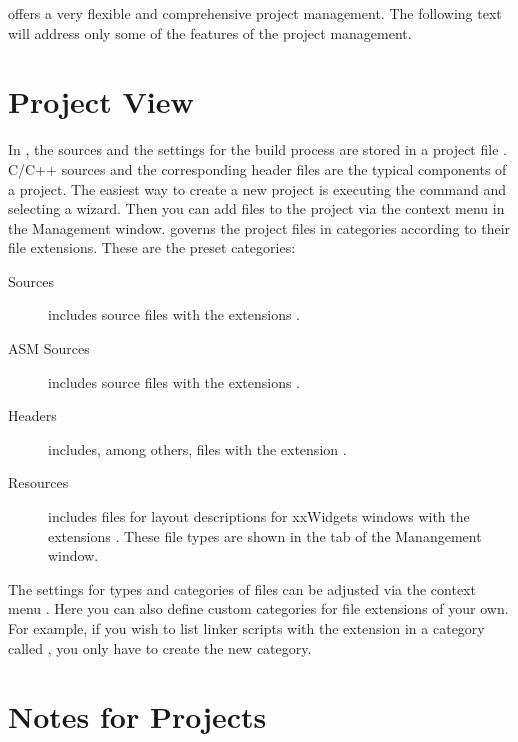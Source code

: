 \codeblocks offers a very flexible and comprehensive project management. The following text will address only some of the features of the project management.

\section{Project View}\label{sec:categories}

In \codeblocks, the sources and the settings for the build process are stored in a project file . C/C++ sources and the corresponding header files are the typical components of a project. The easiest way to create a new project is  executing the command  and selecting a wizard. Then you can add files to the project via the context menu  in the Management window. \codeblocks governs the project files in categories according to their file extensions. These are the preset categories:

\begin{description}
\item[Sources] includes source files with the extensions .
\item[ASM Sources] includes source files with the extensions .
\item[Headers] includes, among others, files with the extension .
\item[Resources] includes files for layout descriptions for xxWidgets windows with the extensions . These file types are shown in the  tab of the Manangement window.
\end{description}

The settings for types and categories of files can be adjusted via the context menu . Here you can also define custom categories for file extensions of your own. For example, if you wish to list linker scripts with the  extension in a category called , you only have to create the new category.


\section{Notes for Projects}

